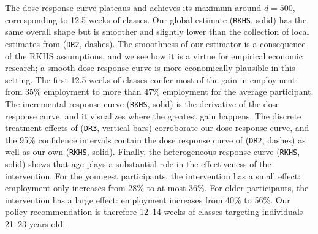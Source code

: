 The dose response curve plateaus and achieves its maximum around $d=500$, corresponding to 12.5 weeks of classes. Our global estimate (\texttt{RKHS}, solid) has the same overall shape but is smoother and slightly lower than the collection of local estimates from \cite{colangelo2020double} (\texttt{DR2}, dashes). The smoothness of our estimator is a consequence of the RKHS assumptions, and we see how it is a virtue for empirical economic research; a smooth dose response curve is more economically plausible in this setting. The first 12.5 weeks of classes confer most of the gain in employment: from 35\% employment to more than 47\% employment for the average participant. The incremental response curve (\texttt{RKHS}, solid) is the derivative of the dose response curve, and it visualizes where the greatest gain happens. The discrete treatment effects of \cite{singh2021debiased} (\texttt{DR3}, vertical bars) corroborate our dose response curve, and the 95\% confidence intervals contain the dose response curve of \cite{colangelo2020double} (\texttt{DR2}, dashes) as well as our own (\texttt{RKHS}, solid). 
Finally, the heterogeneous response curve (\texttt{RKHS}, solid) shows that age plays a substantial role in the effectiveness of the intervention. For the youngest participants, the intervention has a small effect: employment only increases from 28\% to at most 36\%. For older participants, the intervention has a large effect: employment increases from 40\% to 56\%. %
Our policy recommendation is therefore 12--14 weeks of classes targeting individuals 21--23 years old.
